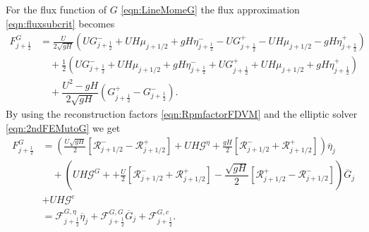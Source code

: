 For the flux function of $G$ \eqref{eqn:LineMomeG} the flux approximation \eqref{eqn:fluxsubcrit} becomes
\begin{align}
F^G_{j+\frac{1}{2}} &= \frac{U}{2 \sqrt{gH}} \left(UG^-_{j+\frac{1}{2}} + UH \mu_{j+1/2} + gH\eta^-_{j+\frac{1}{2}} - UG^+_{j+\frac{1}{2}} - UH \mu_{j+1/2} - gH\eta^+_{j+\frac{1}{2}}  \right)   \nonumber \\ & \quad + \frac{1}{2}\left(UG^-_{j+\frac{1}{2}} + UH \mu_{j+1/2} + gH\eta^-_{j+\frac{1}{2}} + UG^+_{j+\frac{1}{2}} + UH \mu_{j+1/2} + gH\eta^+_{j+\frac{1}{2}}\right) \nonumber \\ & \quad+ \dfrac{U^2 - gH}{2\sqrt{g H}} \left ( G^+_{j+\frac{1}{2}} - G^-_{j+\frac{1}{2}} \right ).
\end{align}
By using the reconstruction factors \eqref{eqn:RpmfactorFDVM} and the elliptic solver \eqref{eqn:2ndFEMutoG} we get
\begin{align}
F^G_{j+\frac{1}{2}} &= \left(\frac{U\sqrt{gH}}{2} \left[ \mathcal{R}^-_{j+1/2} - \mathcal{R}^+_{j+1/2}  \right] + UH\mathcal{G}^{\eta} + \frac{gH}{2} \left[ \mathcal{R}^-_{j+1/2} +\mathcal{R}^+_{j+1/2} \right]   \right)\overline{\eta}_j \nonumber \\ & \quad+ \left(UH\mathcal{G}^{G} + + \frac{U}{2} \left[ \mathcal{R}^-_{j+1/2} +\mathcal{R}^+_{j+1/2} \right] - \dfrac{\sqrt{g H}}{2} \left [\mathcal{R}^+_{j+1/2} - \mathcal{R}^-_{j+1/2} \right ]   \right) \overline{G}_j \nonumber \\ &+ UH\mathcal{G}^{c}  \nonumber \\
& = \mathcal{F}^{G, \eta}_{j+\frac{1}{2}} \overline{\eta}_{j} + \mathcal{F}^{G, G}_{j+\frac{1}{2}} \overline{G}_{j} + \mathcal{F}^{G, c}_{j+\frac{1}{2}}   .
\label{eqn:FluxfactorsubcritG}
\end{align}




